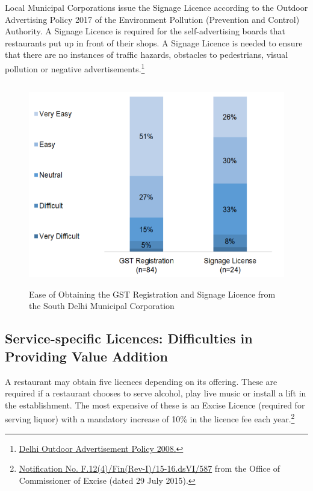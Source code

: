 \documentclass[a4paper, 12pt]{article}
\begin{document}
		Local Municipal Corporations issue the Signage Licence according to the Outdoor Advertising Policy 2017 of the Environment Pollution (Prevention and Control) Authority. A Signage Licence is required for the self-advertising boards that restaurants put 
up in front of their shops. A Signage Licence is needed to ensure that there are no instances of traffic hazards, obstacles to pedestrians, visual pollution or negative advertisements.\footnote{\href{https://bit.ly/2xdiNzk}{Delhi Outdoor Advertisement Policy 2008.}}
		
		\begin{figure}[H]
                    	\centering
                    	\includegraphics[height = 3.5in]{Figure3.png}
                    	\caption[Optional Caption]{Ease of Obtaining the GST Registration and Signage Licence from the South Delhi Municipal Corporation}
		\end{figure}
		
		\subsection{Service-specific Licences: Difficulties in Providing Value Addition}
		
		A restaurant may obtain five licences depending on its offering. These are required if a restaurant chooses to serve alcohol, play live music or install a lift in the establishment. The most expensive of these is an Excise Licence (required for serving liquor) 
with a mandatory increase of 10\% in the licence fee each year.\footnote{\href{https://bit.ly/2xoejoG}{Notification No. F.12(4)/Fin(Rev-I)/15-16.dsVI/587} from the Office of Commissioner of Excise (dated 29 July 2015).}
		
\end{document}
